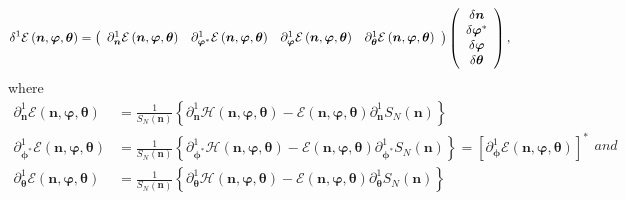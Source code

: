 \documentclass[aps,preprint]{revtex4}%
\begin{document}
\begin{equation}
\delta^{1}\mathcal{E}\left(  \boldsymbol{n},\boldsymbol{\varphi}%
,\boldsymbol{\theta}\right)  =\left(
\begin{array}
[c]{cccc}%
\partial_{\boldsymbol{n}}^{1}\mathcal{E}\left(  \boldsymbol{n}%
,\boldsymbol{\varphi},\boldsymbol{\theta}\right)  & \partial
_{\boldsymbol{\varphi}^{\ast}}^{1}\mathcal{E}\left(  \boldsymbol{n}%
,\boldsymbol{\varphi},\boldsymbol{\theta}\right)  & \partial
_{\boldsymbol{\varphi}}^{1}\mathcal{E}\left(  \boldsymbol{n}%
,\boldsymbol{\varphi},\boldsymbol{\theta}\right)  & \partial
_{\boldsymbol{\theta}}^{1}\mathcal{E}\left(  \boldsymbol{n}%
,\boldsymbol{\varphi},\boldsymbol{\theta}\right)
\end{array}
\right)  \left(
\begin{array}
[c]{c}%
\delta\boldsymbol{n}\\
\delta\boldsymbol{\varphi}^{\ast}\\
\delta\boldsymbol{\varphi}\\
\delta\boldsymbol{\theta}%
\end{array}
\right)  ,
\end{equation}
where
\begin{subequations}
\label{Fderiv}%
\begin{align}
\partial_{\boldsymbol{n}}^{1}\mathcal{E}\left(  \boldsymbol{n}%
,\boldsymbol{\varphi},\boldsymbol{\theta}\right)   &  =\frac{1}{S_{N}\left(
\boldsymbol{n}\right)  }\left\{  \partial_{\boldsymbol{n}}^{1}\mathcal{H}%
\left(  \boldsymbol{n},\boldsymbol{\varphi},\boldsymbol{\theta}\right)
-\mathcal{E}\left(  \boldsymbol{n},\boldsymbol{\varphi},\boldsymbol{\theta
}\right)  \partial_{\boldsymbol{n}}^{1}S_{N}\left(  \boldsymbol{n}\right)
\right\} \\
\partial_{\boldsymbol{\phi}^{\ast}}^{1}\mathcal{E}\left(  \boldsymbol{n}%
,\boldsymbol{\varphi},\boldsymbol{\theta}\right)   &  =\frac{1}{S_{N}\left(
\boldsymbol{n}\right)  }\left\{  \partial_{\boldsymbol{\phi}^{\ast}}%
^{1}\mathcal{H}\left(  \boldsymbol{n},\boldsymbol{\varphi},\boldsymbol{\theta
}\right)  -\mathcal{E}\left(  \boldsymbol{n},\boldsymbol{\varphi
},\boldsymbol{\theta}\right)  \partial_{\boldsymbol{\phi}^{\ast}}^{1}%
S_{N}\left(  \boldsymbol{n}\right)  \right\}  =\left[  \partial
_{\boldsymbol{\phi}}^{1}\mathcal{E}\left(  \boldsymbol{n},\boldsymbol{\varphi
},\boldsymbol{\theta}\right)  \right]  ^{\ast}\\
\partial_{\boldsymbol{\theta}}^{1}\mathcal{E}\left(  \boldsymbol{n}%
,\boldsymbol{\varphi},\boldsymbol{\theta}\right)   &  =\frac{1}{S_{N}\left(
\boldsymbol{n}\right)  }\left\{  \partial_{\boldsymbol{\theta}}^{1}%
\mathcal{H}\left(  \boldsymbol{n},\boldsymbol{\varphi},\boldsymbol{\theta
}\right)  -\mathcal{E}\left(  \boldsymbol{n},\boldsymbol{\varphi
},\boldsymbol{\theta}\right)  \partial_{\boldsymbol{\theta}}^{1}S_{N}\left(
\boldsymbol{n}\right)  \right\}
\end{align}
and
\end{subequations}
\end{document}
